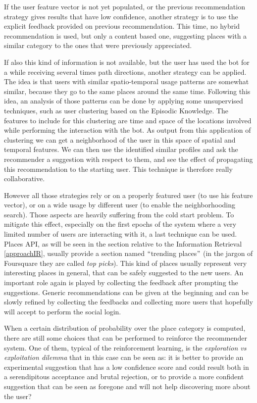 If the user feature vector is not yet populated, or the previous recommendation strategy gives results that have low confidence, another strategy is to use the explicit feedback provided on previous recommendation. This time, no hybrid recommendation is used, but only a content based one, suggesting places with a similar category to the ones that were previously appreciated.

If also this kind of information is not available, but the user has used the bot for a while receiving several times path directions, another strategy can be applied. The idea is that users with similar spatio-temporal usage patterns are somewhat similar, because they go to the same places around the same time. Following this idea, an analysis of those patterns can be done by applying some unsupervised techniques, such as user clustering based on the Episodic Knowledge. The features to include for this clustering are time and space of the locations involved while performing the interaction with the bot. As output from this application of clustering we can get a neighborhood of the user in this space of spatial and temporal features. We can then use the identified similar profiles and ask the recommender a suggestion with respect to them, and see the effect of propagating this recommendation to the starting user. This technique is therefore really collaborative.

However all those strategies rely or on a properly featured user (to use his feature vector), or on a wide usage by different user (to enable the neighborhooding search). Those aspects are heavily suffering from the cold start problem. To mitigate this effect, especially on the first epochs of the system where a very limited number of users are interacting with it, a last technique can be used. Places API, as will be seen in the section relative to the Information Retrieval \ref{approachIR}, usually provide a section named $``$trending places$"$  (in the jargon of Foursquare they are called \textit{top picks}). This kind of places usually represent very interesting places in general, that can be safely suggested to the new users. An important role again is played by collecting the feedback after prompting the suggestions. Generic recommendations can be given at the beginning and can be slowly refined by collecting the feedbacks and collecting more users that hopefully will accept to perform the social login.

When a certain distribution of probability over the place category is computed, there are still some choices that can be performed to reinforce the recommender system. One of them, typical of the reinforcement learning, is the \textit{exploration vs exploitation dilemma} that in this case can be seen as: it is better to provide an experimental suggestion that has a low confidence score and could result both in a serendipitous acceptance and brutal rejection, or to provide a more confident suggestion that can be seen as foregone and will not help discovering more about the user? 

